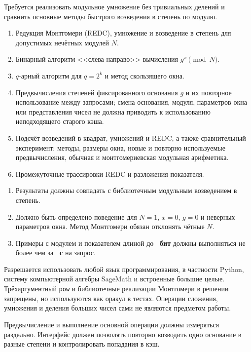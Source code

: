 \documentclass{ca-capstone}
\begin{document}


\goal
Требуется реализовать модульное умножение без тривиальных делений и сравнить основные методы
быстрого возведения в степень по модулю.

\functionality
\begin{enumerate}
  \item Редукция Монтгомери (REDC), умножение и возведение в степень для допустимых нечётных
    модулей $N$.
  \item Бинарный алгоритм <<слева-направо>> вычисления $g^x \pmod{N}$.
  \item $q$-арный алгоритм для $q=2^k$ и метод скользящего окна.
  \item Предвычисления степеней фиксированного основания $g$ и их повторное использование между
    запросами; смена основания, модуля, параметров окна или представления чисел не должна приводить
    к использованию неподходящего старого кэша.
  \item Подсчёт возведений в квадрат, умножений и REDC, а также сравнительный эксперимент:
    методы, размеры окна, новые и повторно используемые предвычисления, обычная и
    монтгомериевская модульная арифметика.
  \item Промежуточные трассировки REDC и разложения показателя.
\end{enumerate}

\requirements
\begin{enumerate}
  \item Результаты должны совпадать с библиотечным модульным возведением в степень.
  \item Должно быть определено поведение для $N=1$, $x=0$, $g=0$  и неверных параметров окна. 
  Метод Монтгомери обязан отклонять чётные $N$.
  \item Примеры с модулем и показателем длиной до \textbf{\ReqBitsMax~бит} должны выполняться
    не более чем за \textbf{\ReqSeconds~с} на запрос.
\end{enumerate}

\details
Разрешается использовать любой язык программирования, в частности Python, систему 
компьютерной алгебры SageMath и встроенные большие целые. Трёхаргументный \texttt{pow} и
библиотечные реализации Монтгомери в решении запрещены, но используются как оракул в тестах.
Операции сложения, умножения и деления больших чисел сами не являются предметом работы.

Предвычисление и выполнение основной операции должны измеряться раздельно. Интерфейс должен 
позволять повторно возводить одно основание в разные степени и контролировать попадания в кэш.
\end{document}
